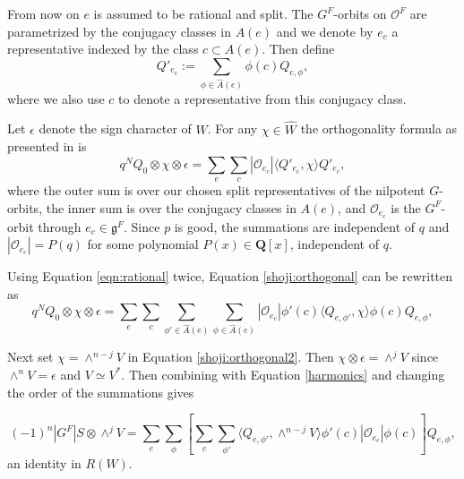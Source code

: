 \documentclass[10pt]{amsart}
\newcommand{\g}{\mathfrak{g}}
\newcommand{\zz}{\mathbf Z}
\newcommand{\qq}{\mathbf Q}
\newcommand{\orbit}{\mathcal O}
\renewcommand{\wr}{\hat{W}}
\newcommand{\ar}{{\hat{A}}(e)}
\theoremstyle{plain}
\theoremstyle{definition}
\theoremstyle{remark}
\begin{document}
From now on $e$ is assumed to be rational and split.  
The $G^F$-orbits on $\orbit^F$ are parametrized by the conjugacy classes in $A(e)$ and we denote by $e_c$ a representative indexed by the class $c \subset A(e)$.  Then define 
\begin{equation} \label{eqn:rational}
Q'_{e_c} := \sum_{\phi \in \ar}  \phi(c) Q_{e, \phi},
\end{equation} 
where we also use $c$ to denote a representative from this conjugacy class.

Let $\epsilon$ denote the sign character of $W$.
For any $\chi \in \wr$ the orthogonality formula as presented in \cite{shoji:green_f4} is 
\begin{equation}  \label{shoji:orthogonal}
q^N  Q_0 \otimes \chi \otimes \epsilon= \sum_{e} \sum_{c} | \orbit_{e_c} | \langle Q'_{e_c}, \chi \rangle Q'_{e_c},
\end{equation} 
where the outer sum is over our chosen split representatives of the nilpotent $G$-orbits, the inner sum is over the conjugacy classes in $A(e)$,
and $\orbit_{e_c}$ is the $G^F$-orbit through $e_c \in \g^F$.   Since $p$ is good, the summations are independent of $q$ and 
$|\orbit_{e_c}| = P(q)$  for some polynomial $P(x) \in \qq[x]$, independent of $q$.

Using Equation \ref{eqn:rational} twice, Equation \ref{shoji:orthogonal} can be rewritten as
\begin{equation} \label{shoji:orthogonal2}
q^N  Q_0 \otimes \chi \otimes \epsilon =  \sum_{e} \sum_{c}  \sum_{\phi' \in \ar}  \sum_{\phi \in \ar} |\orbit_{e_c}| \phi'(c) \langle Q_{e, \phi'}, \chi \rangle  \phi(c) Q_{e, \phi},
\end{equation} 

Next set $\chi = \wedge^{n-j} V$ in Equation \ref{shoji:orthogonal2}.  Then $\chi \otimes \epsilon = \wedge^{j} V$ since $\wedge^n V = \epsilon$ and $V \simeq V^*$.
Then combining with Equation \ref{harmonics} and changing the order of the summations gives

\begin{equation}  \label{equation:1}
(-1)^n  |G^F| S \otimes \wedge^j V  =  \sum_{e} \sum_{\phi} \left[ \sum_c  \sum_{\phi'} \langle Q_{e, \phi'}, \wedge^{n-j} V \rangle \phi'(c) |\orbit_{e_c}|  \phi(c) \right]  Q_{e, \phi},
\end{equation}
an identity in $R(W)$. %

\subsection{}\label{subsection:gns}
\end{document}
